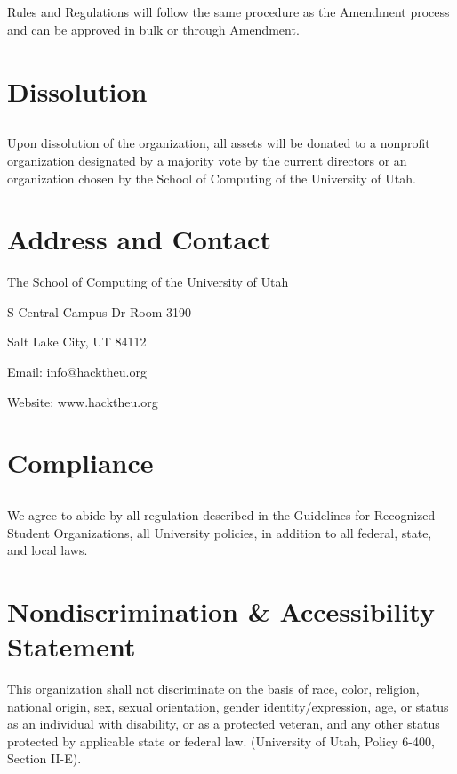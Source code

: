 \documentclass[12pt]{article}
\begin{document}
\subsection{} Rules and Regulations will follow the same procedure as the Amendment 
process and can be approved in bulk or through Amendment.

\section{Dissolution}

\subsection{} Upon dissolution of the organization, all assets will be donated to 
a nonprofit organization designated by a majority vote by the current directors
or an organization chosen by the School of Computing of the University of Utah.

\section{Address and Contact}

\noindent The School of Computing of the University of Utah

 S Central Campus Dr Room 3190

\noindent Salt Lake City, UT 84112

\noindent Email: info@hacktheu.org

\noindent Website: www.hacktheu.org

\section{Compliance}

\subsection{} We agree to abide by all regulation described in the 
Guidelines for Recognized Student Organizations, 
all University policies, in addition to all federal, state, and local laws.

\section{Nondiscrimination \& Accessibility Statement}

\noindent This organization shall not discriminate on the basis of race, color, religion, 
national origin, sex, sexual orientation, gender identity/expression, age, or status
as an individual with disability, or as a protected veteran, and any other status protected
by applicable state or federal law. (University of Utah, Policy 6-400, Section II-E). \\
\end{document}
